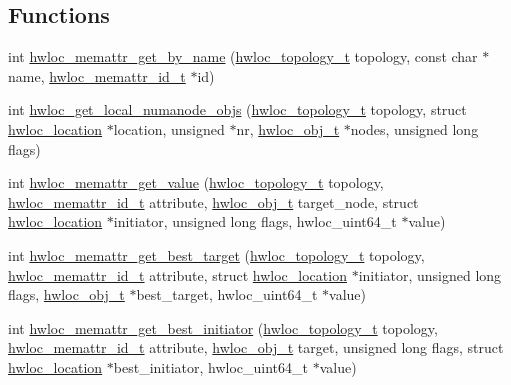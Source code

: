 \subsection*{Functions}
\begin{DoxyCompactItemize}
\item 
int \hyperlink{a00211_ga79f44f8e1cfd2f97a19171417a75a137}{hwloc\+\_\+memattr\+\_\+get\+\_\+by\+\_\+name} (\hyperlink{a00186_ga9d1e76ee15a7dee158b786c30b6a6e38}{hwloc\+\_\+topology\+\_\+t} topology, const char $\ast$name, \hyperlink{a00211_gacc82003a8610be554615995f0996c888}{hwloc\+\_\+memattr\+\_\+id\+\_\+t} $\ast$id)
\item 
int \hyperlink{a00211_ga569e80c5be7ef27649b0ef5aa52ffcdc}{hwloc\+\_\+get\+\_\+local\+\_\+numanode\+\_\+objs} (\hyperlink{a00186_ga9d1e76ee15a7dee158b786c30b6a6e38}{hwloc\+\_\+topology\+\_\+t} topology, struct \hyperlink{a00314}{hwloc\+\_\+location} $\ast$location, unsigned $\ast$nr, \hyperlink{a00185_ga79b8ab56877ef99ac59b833203391c7d}{hwloc\+\_\+obj\+\_\+t} $\ast$nodes, unsigned long flags)
\item 
int \hyperlink{a00211_ga297e4a9adc2272446a4c7449dacef0df}{hwloc\+\_\+memattr\+\_\+get\+\_\+value} (\hyperlink{a00186_ga9d1e76ee15a7dee158b786c30b6a6e38}{hwloc\+\_\+topology\+\_\+t} topology, \hyperlink{a00211_gacc82003a8610be554615995f0996c888}{hwloc\+\_\+memattr\+\_\+id\+\_\+t} attribute, \hyperlink{a00185_ga79b8ab56877ef99ac59b833203391c7d}{hwloc\+\_\+obj\+\_\+t} target\+\_\+node, struct \hyperlink{a00314}{hwloc\+\_\+location} $\ast$initiator, unsigned long flags, hwloc\+\_\+uint64\+\_\+t $\ast$value)
\item 
int \hyperlink{a00211_ga884d1f2ad745c2fa69c1583c82d28f10}{hwloc\+\_\+memattr\+\_\+get\+\_\+best\+\_\+target} (\hyperlink{a00186_ga9d1e76ee15a7dee158b786c30b6a6e38}{hwloc\+\_\+topology\+\_\+t} topology, \hyperlink{a00211_gacc82003a8610be554615995f0996c888}{hwloc\+\_\+memattr\+\_\+id\+\_\+t} attribute, struct \hyperlink{a00314}{hwloc\+\_\+location} $\ast$initiator, unsigned long flags, \hyperlink{a00185_ga79b8ab56877ef99ac59b833203391c7d}{hwloc\+\_\+obj\+\_\+t} $\ast$best\+\_\+target, hwloc\+\_\+uint64\+\_\+t $\ast$value)
\item 
int \hyperlink{a00211_ga9a453879892893cf8a3fcd431ade84cd}{hwloc\+\_\+memattr\+\_\+get\+\_\+best\+\_\+initiator} (\hyperlink{a00186_ga9d1e76ee15a7dee158b786c30b6a6e38}{hwloc\+\_\+topology\+\_\+t} topology, \hyperlink{a00211_gacc82003a8610be554615995f0996c888}{hwloc\+\_\+memattr\+\_\+id\+\_\+t} attribute, \hyperlink{a00185_ga79b8ab56877ef99ac59b833203391c7d}{hwloc\+\_\+obj\+\_\+t} target, unsigned long flags, struct \hyperlink{a00314}{hwloc\+\_\+location} $\ast$best\+\_\+initiator, hwloc\+\_\+uint64\+\_\+t $\ast$value)
\end{DoxyCompactItemize}


